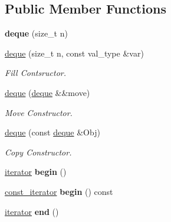 \subsection*{Public Member Functions}
\begin{DoxyCompactItemize}
\item 
\hypertarget{classdeque_a2f2dd0e036a1daee291a01a9a03ad9d2}{}\label{classdeque_a2f2dd0e036a1daee291a01a9a03ad9d2} 
{\bfseries deque} (size\+\_\+t n)
\item 
\hypertarget{classdeque_a77986f355bfcf50434543c317b0fa370}{}\label{classdeque_a77986f355bfcf50434543c317b0fa370} 
\hyperlink{classdeque_a77986f355bfcf50434543c317b0fa370}{deque} (size\+\_\+t n, const val\+\_\+type \&var)
\begin{DoxyCompactList}\small\item\em Fill Contsructor. \end{DoxyCompactList}\item 
\hypertarget{classdeque_acb0db0be71c3bf8110742d9fae3f38e1}{}\label{classdeque_acb0db0be71c3bf8110742d9fae3f38e1} 
\hyperlink{classdeque_acb0db0be71c3bf8110742d9fae3f38e1}{deque} (\hyperlink{classdeque}{deque} \&\&move)
\begin{DoxyCompactList}\small\item\em Move Constructor. \end{DoxyCompactList}\item 
\hypertarget{classdeque_afbd8f542cd8abb0dcb03c0846e288228}{}\label{classdeque_afbd8f542cd8abb0dcb03c0846e288228} 
\hyperlink{classdeque_afbd8f542cd8abb0dcb03c0846e288228}{deque} (const \hyperlink{classdeque}{deque} \&Obj)
\begin{DoxyCompactList}\small\item\em Copy Constructor. \end{DoxyCompactList}\item 
\hypertarget{classdeque_a38f49122a62ca9156a65b201f3f02523}{}\label{classdeque_a38f49122a62ca9156a65b201f3f02523} 
\hyperlink{structdeque__iterator}{iterator} {\bfseries begin} ()
\item 
\hypertarget{classdeque_aa7e5ba5256ea1ada1420b020df653dbd}{}\label{classdeque_aa7e5ba5256ea1ada1420b020df653dbd} 
\hyperlink{structdeque__iterator}{const\+\_\+iterator} {\bfseries begin} () const
\item 
\hypertarget{classdeque_a660c98a282008bbceead5bbe77b97039}{}\label{classdeque_a660c98a282008bbceead5bbe77b97039} 
\hyperlink{structdeque__iterator}{iterator} {\bfseries end} ()
\item 
\hypertarget{classdeque_ab2b99ae02be5ad7bce0d7a5f592342be}{}\label{classdeque_ab2b99ae02be5ad7bce0d7a5f592342be} 

\end{DoxyCompactItemize}
